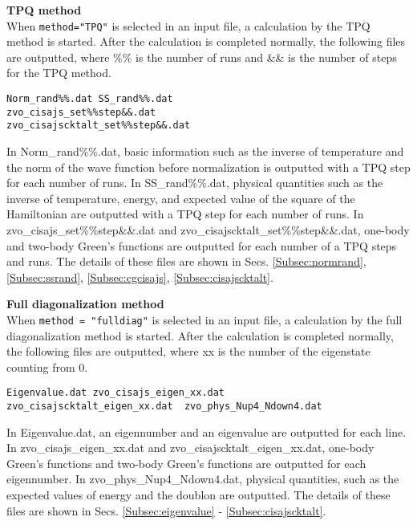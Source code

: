 \begin{description}
\item {\bf TPQ method}\\
  When \verb|method="TPQ"| is selected in an input file,
  a calculation by the TPQ method is started.
  After the calculation is completed normally, the following files are outputted,
  where \%\% is the number of runs and \&\& is the number of steps for the TPQ method.\\
\begin{minipage}{14cm}
\begin{screen}
\begin{verbatim}
Norm_rand%%.dat SS_rand%%.dat
zvo_cisajs_set%%step&&.dat  
zvo_cisajscktalt_set%%step&&.dat  
\end{verbatim}
\end{screen}
\end{minipage}

In Norm\_rand\%\%.dat, basic information such as the inverse of temperature
and the norm of the wave function before normalization
is outputted with a TPQ step for each number of runs.
In SS\_rand\%\%.dat, physical quantities such as the inverse of temperature,
energy, and expected value of the square of the Hamiltonian
are outputted with a TPQ step for each number of runs.
In zvo\_cisajs\_set\%\%step\&\&.dat and zvo\_cisajscktalt\_set\%\%step\&\&.dat,
one-body and two-body Green's functions are outputted
for each number of a TPQ steps and runs.
The details of these files are shown in Secs. \ref{Subsec:normrand}, \ref{Subsec:ssrand},
\ref{Subsec:cgcisajs}, \ref{Subsec:cisajscktalt}.

\item {\bf Full diagonalization method}\\
  When \verb|method = "fulldiag"| is selected in an input file,
  a calculation by the full diagonalization method is started.
  After the calculation is completed normally, the following files are outputted,
  where xx is the number of the eigenstate counting from 0. \\
\begin{minipage}{14cm}
\begin{screen}
\begin{verbatim}
Eigenvalue.dat zvo_cisajs_eigen_xx.dat
zvo_cisajscktalt_eigen_xx.dat  zvo_phys_Nup4_Ndown4.dat
\end{verbatim}
\end{screen}
\end{minipage}

In Eigenvalue.dat, an eigennumber and an eigenvalue are outputted for each line.
In zvo\_cisajs\_eigen\_xx.dat and zvo\_cisajscktalt\_eigen\_xx.dat,
one-body Green's functions and two-body Green's functions are outputted
for each eigennumber. 
In zvo\_phys\_Nup4\_Ndown4.dat, physical quantities,
such as the expected values of energy and the doublon are outputted.
The details of these files are shown in
Secs. \ref{Subsec:eigenvalue} - \ref{Subsec:cisajscktalt}.


\end{description}

